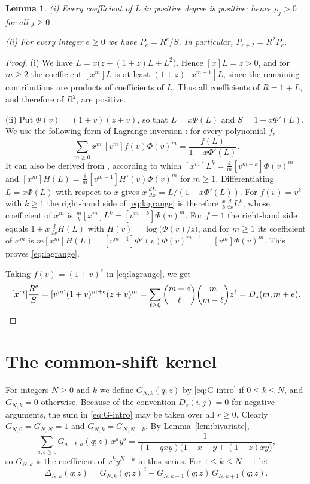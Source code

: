 \documentclass{amsart}
\newtheorem{lemma}[theorem]{Lemma}
\theoremstyle{definition}
\theoremstyle{remark}
\numberwithin{equation}{section}
\numberwithin{table}{section}
\newcommand{\Dz}{D_z}
\newcommand{\coef}[1]{[#1]}
\begin{document}
\begin{lemma}\label{lem:diagonal}
\textup{(i)} Every coefficient of $L$ in positive degree is positive; hence $\rho_j>0$ for all $j\ge 0$.

\textup{(ii)} For every integer $e\ge 0$ we have $P_e=R^e/S$. In particular, $P_{e+2}=R^2P_e$.
\end{lemma}

\begin{proof}
(i) We have $L=x\bigl(z+(1+z)L+L^2\bigr)$. Hence $\coef{x}L=z>0$, and for $m\ge 2$ the coefficient $\coef{x^m}L$ is at least $(1+z)\coef{x^{m-1}}L$, since the remaining contributions are products of coefficients of $L$. Thus all coefficients of $R=1+L$, and therefore of $R^2$, are positive.

(ii) Put $\Phi(v)=(1+v)(z+v)$, so that $L=x\Phi(L)$ and $S=1-x\Phi'(L)$. We use the following form of Lagrange inversion \cite[Theorem~2.1.1, (2.1.4)]{Ge}: for every polynomial $f$,
\begin{equation}\label{eq:lagrange}
\sum_{m\ge 0}x^m\,\coef{v^m}f(v)\Phi(v)^m=\frac{f(L)}{1-x\Phi'(L)}.
\end{equation}
It can also be derived from \cite[Theorem~5.4.2]{St}, according to which $\coef{x^m}L^k=\frac{k}{m}\coef{v^{m-k}}\Phi(v)^m$ and $\coef{x^m}H(L)=\frac1m\coef{v^{m-1}}H'(v)\Phi(v)^m$ for $m\ge 1$. Differentiating $L=x\Phi(L)$ with respect to $x$ gives $x\,\frac{dL}{dx}=L/(1-x\Phi'(L))$. For $f(v)=v^k$ with $k\ge 1$ the right-hand side of \eqref{eq:lagrange} is therefore $\frac{x}{k}\frac{d}{dx}L^k$, whose coefficient of $x^m$ is $\frac{m}{k}\coef{x^m}L^k=\coef{v^{m-k}}\Phi(v)^m$. For $f=1$ the right-hand side equals $1+x\frac{d}{dx}H(L)$ with $H(v)=\log\bigl(\Phi(v)/z\bigr)$, and for $m\ge 1$ its coefficient of $x^m$ is $m\coef{x^m}H(L)=\coef{v^{m-1}}\Phi'(v)\Phi(v)^{m-1}=\coef{v^m}\Phi(v)^m$. This proves \eqref{eq:lagrange}.

Taking $f(v)=(1+v)^e$ in \eqref{eq:lagrange}, we get
\[
\coef{x^m}\frac{R^e}{S}=\coef{v^m}(1+v)^{m+e}(z+v)^m=\sum_{\ell\ge 0}\binom{m+e}{\ell}\binom{m}{m-\ell}z^{\ell}=\Dz(m,m+e). \qedhere
\]
\end{proof}

\section{The common-shift kernel}\label{sec:shift}

For integers $N\ge 0$ and $k$ we define $G_{N,k}(q;z)$ by \eqref{eq:G-intro} if $0\le k\le N$, and $G_{N,k}=0$ otherwise. Because of the convention $\Dz(i,j)=0$ for negative arguments, the sum in \eqref{eq:G-intro} may be taken over all $r\ge 0$. Clearly $G_{N,0}=G_{N,N}=1$ and $G_{N,k}=G_{N,N-k}$. By Lemma~\ref{lem:bivariate},
\[
\sum_{a,b\ge 0}G_{a+b,a}(q;z)\,x^ay^b=\frac{1}{(1-qxy)\bigl(1-x-y+(1-z)xy\bigr)},
\]
so $G_{N,k}$ is the coefficient of $x^ky^{N-k}$ in this series. For $1\le k\le N-1$ let
\[
\Delta_{N,k}(q;z)=G_{N,k}(q;z)^2-G_{N,k-1}(q;z)\,G_{N,k+1}(q;z).
\]
\end{document}
